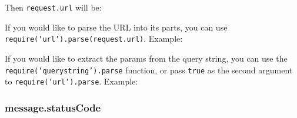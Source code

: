 Then \texttt{request.url} will be:

\begin{Shaded}
\begin{Highlighting}[]
\end{Highlighting}
\end{Shaded}

If you would like to parse the URL into its parts, you can use
\texttt{require('url').parse(request.url)}. Example:

\begin{Shaded}
\begin{Highlighting}[]
\NormalTok{(}\NormalTok{(}\NormalTok{)}
\NormalTok{\{ }\NormalTok{: }\NormalTok{,}
  \NormalTok{: }\NormalTok{,}
  \NormalTok{: }\NormalTok{,}
  \NormalTok{: } \NormalTok{\}}
\end{Highlighting}
\end{Shaded}

If you would like to extract the params from the query string, you can
use the \texttt{require('querystring').parse} function, or pass
\texttt{true} as the second argument to \texttt{require('url').parse}.
Example:

\begin{Shaded}
\begin{Highlighting}[]
\NormalTok{(}\NormalTok{(}\NormalTok{, }\NormalTok{)}
\NormalTok{\{ }\NormalTok{: }\NormalTok{,}
  \NormalTok{: }\NormalTok{,}
  \NormalTok{: \{ }\NormalTok{: } \NormalTok{\},}
  \NormalTok{: } \NormalTok{\}}
\end{Highlighting}
\end{Shaded}

\subsubsection{message.statusCode}\label{message.statuscode}

